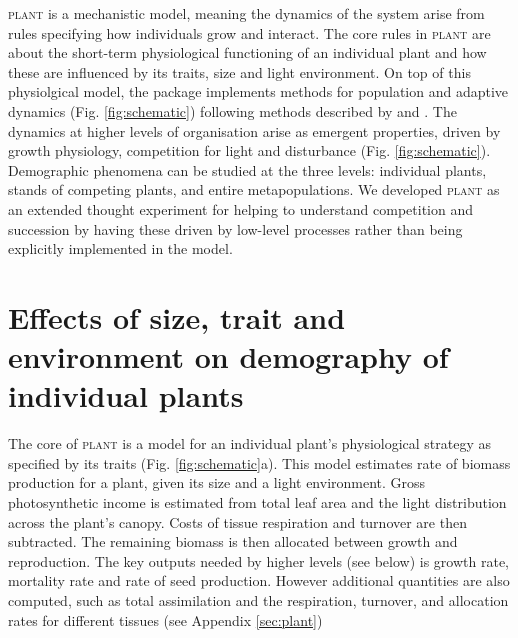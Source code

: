 \documentclass[a4paper,11pt]{article}
\newcommand{\plant}{\textsc{plant}}
\begin{document}
{\plant} is a mechanistic model, meaning the dynamics of the system
arise from rules specifying how individuals grow and interact.  The
core rules in {\plant} are about the short-term physiological
functioning of an individual plant and how these are influenced by its
traits, size and light environment.
%
On top of this physiolgical model, the package implements methods for
population and adaptive dynamics (Fig.  \ref{fig:schematic}) following
methods described by \citet{Falster-2011} and
\citet{Falster-2015}. 
%
The dynamics at higher levels of organisation arise as emergent
properties, driven by growth physiology, competition for light and
disturbance (Fig.  \ref{fig:schematic}). Demographic phenomena can be
studied at the three levels: individual plants, stands of competing
plants, and entire metapopulations.
%
We developed {\plant} as an extended thought experiment for helping to
understand competition and succession by having these driven by
low-level processes rather than being explicitly implemented in the
model.
%
%
%

\section{Effects of size, trait and environment on demography of individual plants}

The core of {\plant} is a model for an individual plant's
physiological strategy as specified by its traits
(Fig. \ref{fig:schematic}a). This model estimates rate of biomass
production for a plant, given its size and a light environment. Gross
photosynthetic income is estimated from total leaf area and the light
distribution across the plant's canopy. Costs of tissue respiration
and turnover are then subtracted. The remaining biomass is then
allocated between growth and reproduction.  
%
The key outputs needed by higher levels (see below) is growth rate,
mortality rate and rate of seed production.  However additional
quantities are also computed, such as total assimilation and the
respiration, turnover, and allocation rates for different tissues (see
Appendix \ref{sec:plant})
\end{document}
